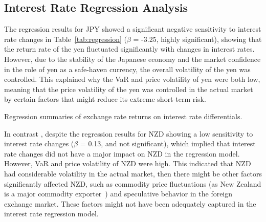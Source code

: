 \documentclass{article}
\begin{document}
\subsection{Interest Rate Regression Analysis}
The regression results for JPY showed a significant negative sensitivity to interest rate changes in Table~\ref{tab:regression} ($\beta$ = -3.25, highly significant), showing that the return rate of the yen fluctuated significantly with changes in interest rates. However, due to the stability of the Japanese economy and the market confidence in the role of yen as a safe-haven currency, the overall volatility of the yen was controlled. This explained why the VaR and price volatility of yen were both low, meaning that the price volatility of the yen was controlled in the actual market by certain factors that might reduce its extreme short-term risk.

\begin{table}[H]
\centering
\caption{Regression summaries of exchange rate returns on interest rate differentials.} 
\label{tab:regression}
\end{table}
In contrast , despite the regression results for NZD showing a low sensitivity to interest rate changes ($\beta$ = 0.13, and not significant), which implied that interest rate changes did not have a major impact on NZD in the regression model. However, VaR and price volatility of NZD were high. This indicated that NZD had considerable volatility in the actual market, then there might be other factors significantly affected NZD, such as commodity price fluctuations (as New Zealand is a major commodity exporter~\cite{blundell1990exchange}) and speculative behavior in the foreign exchange market. These factors might not have been adequately captured in the interest rate regression model.
\end{document}
